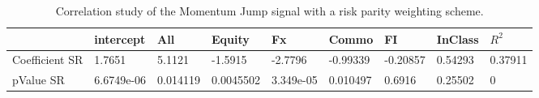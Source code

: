 \begin{table}[H]
\centering
\begin{tabular}{lllllllll}
\hline& intercept & All & Equity & Fx & Commo & FI & InClass & $R^{2}$ \\ 
\hline 
Coefficient SR & 1.7651 & 5.1121 & -1.5915 & -2.7796 & -0.99339 & -0.20857 & 0.54293 & 0.37911 \\ 
pValue SR & 6.6749e-06 & 0.014119 & 0.0045502 & 3.349e-05 & 0.010497 & 0.6916 & 0.25502 & 0 \\ 
\hline
\end{tabular}
\caption{Correlation study of the Momentum Jump signal with a risk parity weighting scheme.}
\label{MOMJUMPRP_CORR}
\end{table}